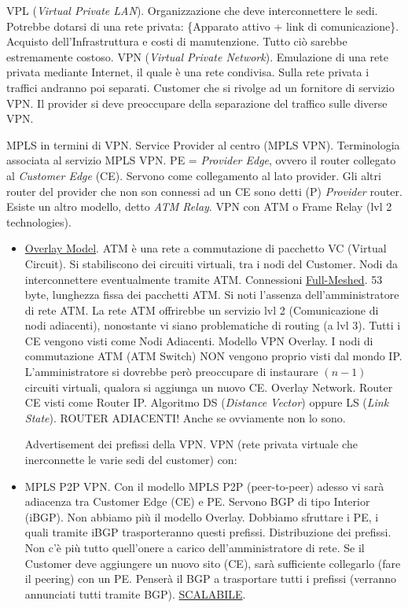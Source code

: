 VPL (\textit{Virtual Private LAN}). Organizzazione che deve interconnettere le sedi. Potrebbe dotarsi di una rete privata: \{Apparato attivo + link di comunicazione\}. Acquisto dell'Infrastruttura e costi di manutenzione. Tutto ciò sarebbe estremamente costoso. VPN (\textit{Virtual Private Network}). Emulazione di una rete privata mediante Internet, il quale è una rete condivisa. Sulla rete privata i traffici andranno poi separati. Customer che si rivolge ad un fornitore di servizio VPN. Il provider si deve preoccupare della separazione del traffico sulle diverse VPN.

MPLS in termini di VPN. Service Provider al centro (MPLS VPN). Terminologia associata al servizio MPLS VPN. PE = \textit{Provider Edge}, ovvero il router collegato al \textit{Customer Edge} (CE). Servono come collegamento al lato provider. Gli altri router del provider che non son connessi ad un CE sono detti (P) \textit{Provider} router. Esiste un altro modello, detto \textit{ATM Relay}. VPN con ATM o Frame Relay (lvl 2 technologies). 

\begin{itemize}

\item{\underline{Overlay Model}}. ATM è una rete a commutazione di pacchetto VC (Virtual Circuit). Si stabiliscono dei circuiti virtuali, tra i nodi del Customer. Nodi da interconnettere eventualmente tramite ATM. Connessioni \underline{Full-Meshed}. 53 byte, lunghezza fissa dei pacchetti ATM. Si noti l'assenza dell'amministratore di rete ATM. La rete ATM offrirebbe un servizio lvl 2 (Comunicazione di nodi adiacenti), nonostante vi siano problematiche di routing (a lvl 3). Tutti i CE vengono visti come Nodi Adiacenti. Modello VPN Overlay. I nodi di commutazione ATM (ATM Switch) NON vengono proprio visti dal mondo IP. L'amministratore si dovrebbe però preoccupare di instaurare $(n-1)$ circuiti virtuali, qualora si aggiunga un nuovo CE. Overlay Network. Router CE visti come Router IP. Algoritmo DS (\textit{Distance Vector}) oppure LS (\textit{Link State}). ROUTER ADIACENTI! Anche se ovviamente non lo sono.

Advertisement dei prefissi della VPN. VPN (rete privata virtuale che inerconnette le varie sedi del customer) con:

\item{MPLS P2P VPN}. Con il modello MPLS P2P (peer-to-peer) adesso vi sarà adiacenza tra Customer Edge (CE) e PE. Servono BGP di tipo Interior (iBGP). Non abbiamo più il modello Overlay. Dobbiamo sfruttare i PE, i quali tramite iBGP trasporteranno questi prefissi. Distribuzione dei prefissi. Non c'è più tutto quell'onere a carico dell'amministratore di rete. Se il Customer deve aggiungere un nuovo sito (CE), sarà sufficiente collegarlo (fare il peering) con un PE. Penserà il BGP a trasportare tutti i prefissi (verranno annunciati tutti tramite BGP). \underline{SCALABILE}.

\end{itemize}

